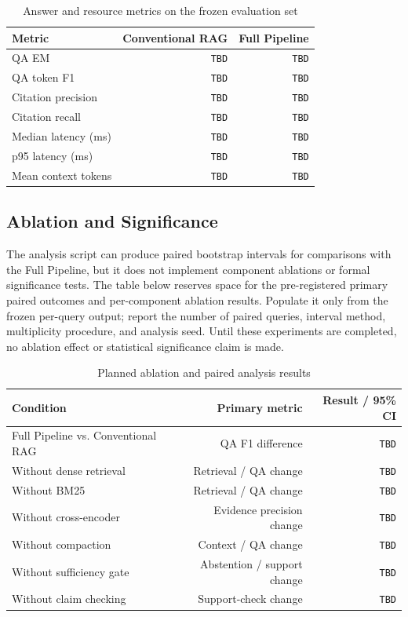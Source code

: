 \documentclass[conference]{IEEEtran}
\begin{document}
\begin{table}[t]
\centering
\caption{Answer and resource metrics on the frozen evaluation set}
\label{tab:answers}
\begin{tabular}{lrr}
\toprule
Metric & Conventional RAG & Full Pipeline \\
\midrule
QA EM & \texttt{TBD} & \texttt{TBD} \\
QA token F1 & \texttt{TBD} & \texttt{TBD} \\
Citation precision & \texttt{TBD} & \texttt{TBD} \\
Citation recall & \texttt{TBD} & \texttt{TBD} \\
Median latency (ms) & \texttt{TBD} & \texttt{TBD} \\
p95 latency (ms) & \texttt{TBD} & \texttt{TBD} \\
Mean context tokens & \texttt{TBD} & \texttt{TBD} \\
\bottomrule
\end{tabular}
\end{table}

\subsection{Ablation and Significance}
The analysis script can produce paired bootstrap intervals for comparisons
with the Full Pipeline, but it does not implement component ablations or
formal significance tests. The table below reserves space for the
pre-registered primary paired outcomes and per-component ablation results.
Populate it only from the frozen per-query output; report the number of
paired queries, interval method, multiplicity procedure, and analysis seed.
Until these experiments are completed, no ablation effect or statistical
significance claim is made.

\begin{table}[t]
\centering
\caption{Planned ablation and paired analysis results}
\label{tab:ablation}
\begin{tabular}{lrr}
\toprule
Condition & Primary metric & Result / 95\% CI \\
\midrule
Full Pipeline vs. Conventional RAG & QA F1 difference & \texttt{TBD} \\
Without dense retrieval & Retrieval / QA change & \texttt{TBD} \\
Without BM25 & Retrieval / QA change & \texttt{TBD} \\
Without cross-encoder & Evidence precision change & \texttt{TBD} \\
Without compaction & Context / QA change & \texttt{TBD} \\
Without sufficiency gate & Abstention / support change & \texttt{TBD} \\
Without claim checking & Support-check change & \texttt{TBD} \\
\bottomrule
\end{tabular}
\end{table}
\end{document}
